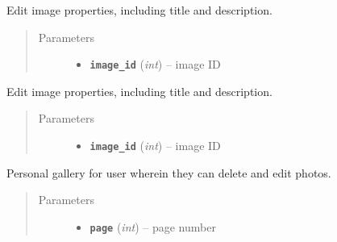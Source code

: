 \documentclass[letterpaper,10pt,english]{sphinxmanual}
\begin{document}
\begin{fulllineitems}
\label{users:get--user-edit-photo-(int-image_id)}
Edit image properties, including title and description.
\begin{quote}\begin{description}
\item[{Parameters}] \leavevmode\begin{itemize}
\item {} 
\textbf{\texttt{image\_id}} (\emph{int}) -- image ID

\end{itemize}

\end{description}\end{quote}

\end{fulllineitems}



\begin{fulllineitems}
\label{users:post--user-edit-photo-(int-image_id)}
Edit image properties, including title and description.
\begin{quote}\begin{description}
\item[{Parameters}] \leavevmode\begin{itemize}
\item {} 
\textbf{\texttt{image\_id}} (\emph{int}) -- image ID

\end{itemize}

\end{description}\end{quote}

\end{fulllineitems}



\begin{fulllineitems}
\label{users:get--user-gallery-(int-page)}
Personal gallery for user wherein they can delete and edit photos.
\begin{quote}\begin{description}
\item[{Parameters}] \leavevmode\begin{itemize}
\item {} 
\textbf{\texttt{page}} (\emph{int}) -- page number

\end{itemize}

\end{description}\end{quote}

\end{fulllineitems}
\end{document}
